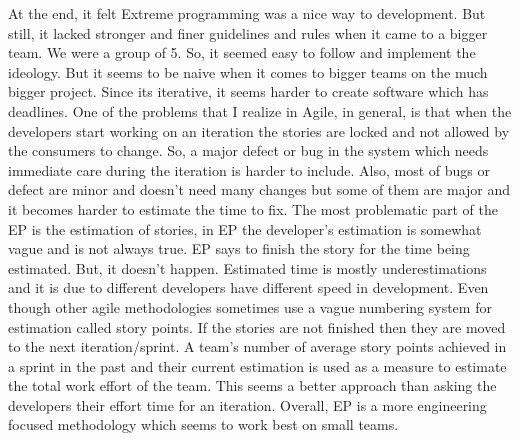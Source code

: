 \documentclass[12pt]{article}
\begin{document}
At the end, it felt Extreme programming was a nice way to development. But still, it lacked stronger and finer guidelines and rules when it came to a bigger team. We were a group of 5. So, it seemed easy to follow and implement the ideology. But it seems to be naive when it comes to bigger teams on the much bigger project. Since its iterative, it seems harder to create software which has deadlines. One of the problems that I realize in Agile, in general, is that when the developers start working on an iteration the stories are locked and not allowed by the consumers to change. So, a major defect or bug in the system which needs immediate care during the iteration is harder to include. Also, most of bugs or defect are minor and doesn't need many changes but some of them are major and it becomes harder to estimate the time to fix. The most problematic part of the EP is the estimation of stories, in EP the developer’s estimation is somewhat vague and is not always true. EP says to finish the story for the time being estimated. But, it doesn't happen. Estimated time is mostly underestimations and it is due to different developers have different speed in development. Even though other agile methodologies sometimes use a vague numbering system for estimation called story points. If the stories are not finished then they are moved to the next iteration/sprint. A team's number of average story points achieved in a sprint in the past and their current estimation is used as a measure to estimate the total work effort of the team. This seems a better approach than asking the developers their effort time for an iteration. Overall, EP is a more engineering focused methodology which seems to work best on small teams.
\end{document}
